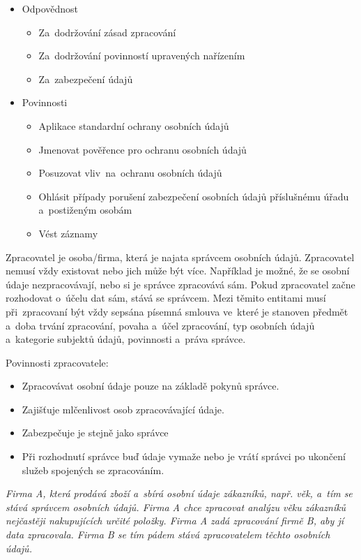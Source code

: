 \begin{itemize}
    \item Odpovědnost
          \begin{itemize}
              \item Za~dodržování zásad zpracování
              \item Za~dodržování povinností upravených nařízením
              \item Za~zabezpečení údajů
          \end{itemize}
    \item Povinnosti
          \begin{itemize}
              \item Aplikace standardní ochrany osobních údajů
              \item Jmenovat pověřence pro ochranu osobních údajů
              \item Posuzovat vliv~na~ochranu osobních údajů
              \item Ohlásit případy porušení zabezpečení osobních údajů příslušnému úřadu a~postiženým osobám
              \item Vést záznamy
          \end{itemize}
\end{itemize}

Zpracovatel je osoba/firma, která je najata správcem osobních údajů. Zpracovatel nemusí vždy existovat nebo jich může být více. Například je možné, že se osobní údaje nezpracovávají, nebo si je správce zpracovává sám. Pokud zpracovatel začne rozhodovat o~účelu dat sám, stává se správcem. Mezi těmito entitami musí při~zpracovaní být vždy sepsána písemná smlouva ve~které je stanoven předmět a~doba trvání zpracování, povaha a~účel zpracování, typ osobních údajů a~kategorie subjektů údajů, povinnosti a~práva správce.

Povinnosti zpracovatele:

\begin{itemize}
    \item Zpracovávat osobní údaje pouze na základě pokynů správce.
    \item Zajišťuje mlčenlivost osob zpracovávající údaje.
    \item Zabezpečuje je stejně jako správce
    \item Při rozhodnutí správce buď údaje vymaže nebo je vrátí správci po ukončení služeb spojených se zpracováním.
\end{itemize}

\emph{Firma A, která prodává zboží a~sbírá osobní údaje zákazníků, např. věk, a~tím se stává správcem osobních údajů. Firma A chce zpracovat analýzu věku zákazníků nejčastěji nakupujících určité položky. Firma A zadá zpracování firmě B, aby jí data zpracovala. Firma B se tím pádem stává zpracovatelem těchto osobních údajů.}

